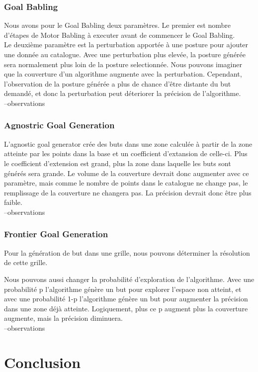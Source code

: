 \documentclass[11pt,french]{report}
\begin{document}
\subsection{Goal Babling}

Nous avons pour le Goal Babling deux paramètres. Le premier est nombre d'étapes de Motor Babling à executer avant de commencer le Goal Babling.\\
Le deuxième paramètre est la perturbation apportée à une posture pour ajouter une donnée au catalogue. Avec une perturbation plus elevée, la posture générée sera normalement plus loin de la posture selectionnée. Nous pouvons imaginer que la couverture d'un algorithme augmente avec la perturbation. Cependant, l'observation de la posture générée a plus de chance d'être distante du but demandé, et donc la perturbation peut déteriorer la précision de l'algorithme.\\
--observations

\subsection{Agnostric Goal Generation}

L'agnostic goal generator crée des buts dans une zone calculée à partir de la zone atteinte par les points dans la base et un coefficient d'extansion de celle-ci. Plus le coefficient d'extension est grand, plus la zone dans laquelle les buts sont générés sera grande. Le volume de la couverture devrait donc augmenter avec ce paramètre, mais comme le nombre de points dans le catalogue ne change pas, le remplissage de la couverture ne changera pas. La précision devrait donc être plus faible.\\
--observations

\subsection{Frontier Goal Generation}

Pour la génération de but dans une grille, nous pouvons déterminer la résolution de cette grille.

Nous pouvons aussi changer la probabilité d'exploration de l'algorithme. Avec une probabilité p l'algorithme génère un but pour explorer l'espace non atteint, et avec une probabilité 1-p l'algorithme génère un but pour augmenter la précision dans une zone déjà atteinte. Logiquement, plus ce p augment plus la couverture augmente, mais la précision diminuera.\\
--observations

\chapter{Conclusion}
\end{document}
